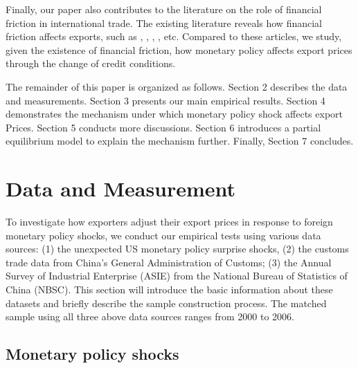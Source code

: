 Finally, our paper also contributes to the literature on the role of financial friction in international trade. 
The existing literature reveals how financial friction affects exports, such as \cite{manova2013credit}, \cite{fan2015credit}, \cite{manova2015firm}, \cite{lin2018international}, etc. Compared to these articles, we study, given the existence of financial friction, how monetary policy affects export prices through the change of credit conditions. 


The remainder of this paper is organized as follows. Section 2 describes the data and measurements. Section 3 presents our main empirical results. Section 4 demonstrates the mechanism under which monetary policy shock affects export Prices. Section 5 conducts more discussions. Section 6 introduces a partial equilibrium model to explain the mechanism further. Finally, Section 7 concludes.


\newpage
\section{Data and Measurement}

To investigate how exporters adjust their export prices in response to foreign monetary policy shocks, we conduct our empirical tests using various data sources: (1) the unexpected US monetary policy surprise shocks, (2) the customs trade data from China’s General Administration of Customs; (3) the Annual Survey of Industrial Enterprise (ASIE) from the National Bureau of Statistics of China (NBSC). This section will introduce the basic information about these datasets and briefly describe the sample construction process. The matched sample using all three above data sources ranges from 2000 to 2006.

\subsection{Monetary policy shocks}

